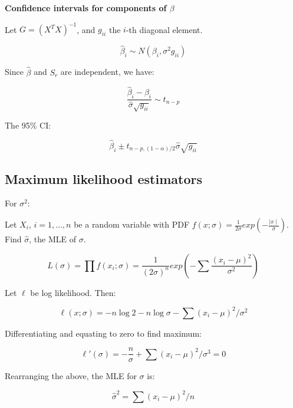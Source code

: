 \textbf{Confidence intervals for components of $\beta$}	


Let $G=(X^T X)^{-1}$, and $g_{ii}$ the $i$-th diagonal element. 

\begin{equation}
\hat{\beta}_i \sim N(\beta_i, \sigma^2 g_{ii})
\end{equation}

Since $\hat{\beta}$ and $S_r$ are independent, we have:

\begin{equation}
\frac{\hat{\beta}_i - \beta_i}{\hat{\sigma}\sqrt{g_{ii}}} \sim t_{n-p}
\end{equation}

The 95\% CI:


\begin{equation}
\hat{\beta}_i \pm t_{n-p,(1-\alpha)/2} \hat{\sigma} \sqrt{g_{ii}} 
\end{equation}

\subsection{Maximum likelihood estimators}

For $\sigma^2$:


Let $X_i$, $i=1,\dots,n$ be a random variable with PDF $f(x; \sigma) = \frac{1}{2\sigma} exp (-\frac{\mid x \mid}{\sigma})$. Find $\hat \sigma$, the MLE of $\sigma$.


\begin{equation}
	L(\sigma) = \prod f(x_i; \sigma) = \frac{1}{(2\sigma)^n} exp (-\sum \frac{(x_i - \mu)^2}{\sigma^2})
\end{equation}

Let $\ell$ be log likelihood. Then:

\begin{equation}
	\ell (x; \sigma) = - n\log 2 - n\log \sigma - \sum (x_i - \mu)^2 /\sigma^2
\end{equation}

Differentiating and equating to zero to find maximum:

\begin{equation}
	\ell ' (\sigma) =  - \frac{n}{\sigma} +  \sum (x_i - \mu)^2 /\sigma^3 =
	 0
\end{equation}

Rearranging the above, the MLE for $\sigma$ is:

\begin{equation}
	\hat \sigma^2 =  \sum (x_i - \mu)^2 /n
\end{equation}

